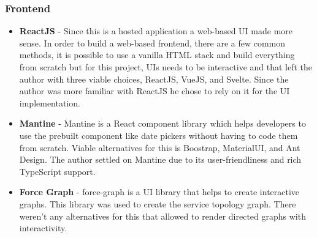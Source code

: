 \subsubsection{Frontend}
\begin{itemize}[noitemsep,nolistsep] 
    \item \textbf{ReactJS} - Since this is a hosted application a web-based UI made more sense. In order to build a web-based frontend, there are a few common methods, it is possible to use a vanilla HTML stack and build everything from scratch but for this project, UIs needs to be interactive and that left the author with three viable choices, ReactJS, VueJS, and Svelte. Since the author was more familiar with ReactJS he chose to rely on it for the UI implementation.
    \item \textbf{Mantine} - Mantine is a React component library which helps developers to use the prebuilt component like date pickers without having to code them from scratch. Viable alternatives for this is Boostrap, MaterialUI, and Ant Design. The author settled on Mantine due to its user-friendliness and rich TypeScript support.
    \item \textbf{Force Graph} - force-graph is a UI library that helps to create interactive graphs. This library was used to create the service topology graph. There weren't any alternatives for this that allowed to render directed graphs with interactivity.
\end{itemize}


